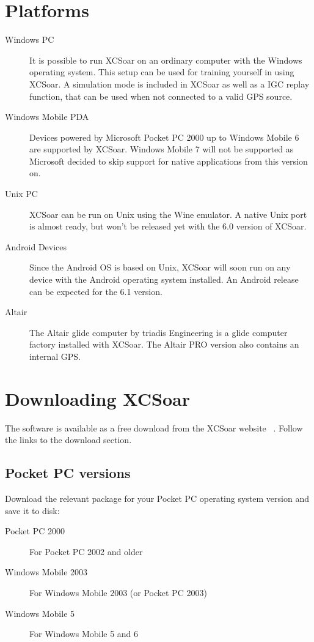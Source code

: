 \documentclass[a4paper,12pt]{refrep}
\begin{document}
\section{Platforms}
\begin{description}
\item[Windows PC]
It is possible to run XCSoar on an ordinary computer with the Windows
operating system. This setup can be used for training yourself in using XCSoar.
A simulation mode is included in XCSoar as well as a IGC replay function, that
can be used when not connected to a valid GPS source.
\item[Windows Mobile PDA]
Devices powered by Microsoft Pocket PC 2000 up to Windows Mobile 6 are
supported by XCSoar. Windows Mobile 7 will not be supported as Microsoft decided
to skip support for native applications from this version on.
\item[Unix PC]
XCSoar can be run on Unix using the Wine emulator. A native Unix port is almost
ready, but won't be released yet with the 6.0 version of XCSoar.
\item[Android Devices]
Since the Android OS is based on Unix, XCSoar will soon run on any device with
the Android operating system installed. An Android release can be expected for
the 6.1 version.
\item[Altair]
The Altair glide computer by triadis Engineering is a glide computer
factory installed with XCSoar.  The Altair PRO version also contains
an internal GPS.
\end{description}

\section{Downloading XCSoar}
The software is available as a free download from the XCSoar website
~\xcsoarwebsite. Follow the links to the download section.

\subsection*{Pocket PC versions}
Download the relevant package for your Pocket PC operating system
version and save it to disk:
\begin{description}
\item[Pocket PC 2000] For Pocket PC 2002 and older
\item[Windows Mobile 2003] For Windows Mobile 2003 (or Pocket PC 2003)
\item[Windows Mobile 5] For Windows Mobile 5 and 6
\end{description}
\end{document}
